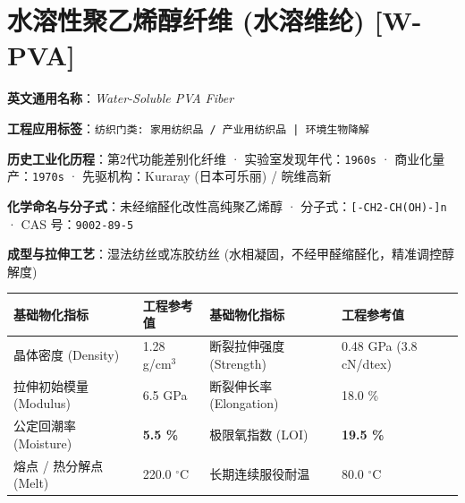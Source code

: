 \documentclass[11pt,openright,twoside,UTF8]{ctexbook}
\begin{document}
\section{水溶性聚乙烯醇纤维 (水溶维纶) [W-PVA]}
\label{sec:w-pva}

\noindent\textbf{英文通用名称}：\textit{Water-Soluble PVA Fiber}\par
\noindent\textbf{工程应用标签}：\texttt{纺织门类: 家用纺织品 / 产业用纺织品 | 环境生物降解}\par
\noindent\textbf{历史工业化历程}：第2代功能差别化纤维 · 实验室发现年代：\texttt{1960s} · 商业化量产：\texttt{1970s} · 先驱机构：Kuraray (日本可乐丽) / 皖维高新\par
\noindent\textbf{化学命名与分子式}：未经缩醛化改性高纯聚乙烯醇 · 分子式：\texttt{[-CH2-CH(OH)-]n} · CAS 号：\texttt{9002-89-5}\par
\noindent\textbf{成型与拉伸工艺}：湿法纺丝或冻胶纺丝 (水相凝固，不经甲醛缩醛化，精准调控醇解度)\par

\vspace{0.15cm}
\begin{center}
\small
\begin{tabularx}{\textwidth}{p{3.8cm}Xp{3.8cm}X}
\toprule
\textbf{基础物化指标} & \textbf{工程参考值} & \textbf{基础物化指标} & \textbf{工程参考值} \\
\midrule
晶体密度 (Density) & 1.28 g/cm$^3$ & 断裂拉伸强度 (Strength) & 0.48 GPa (3.8 cN/dtex) \\
拉伸初始模量 (Modulus) & 6.5 GPa & 断裂伸长率 (Elongation) & 18.0 \% \\
公定回潮率 (Moisture) & \textbf{5.5 \%} & 极限氧指数 (LOI) & \textbf{19.5 \%} \\
熔点 / 热分解点 (Melt) & 220.0 $^\circ\mathrm{C}$ & 长期连续服役耐温 & 80.0 $^\circ\mathrm{C}$ \\
\bottomrule
\end{tabularx}
\end{center}
\vspace{0.15cm}
\end{document}
